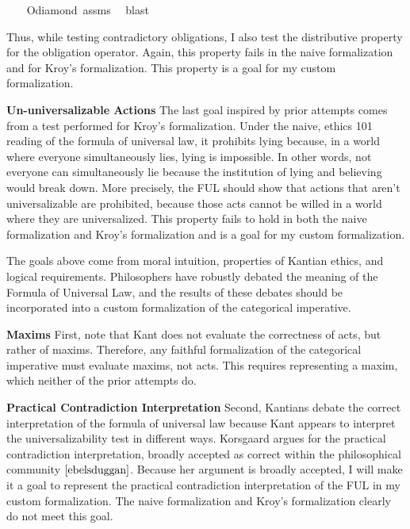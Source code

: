 \begin{isabellebody}
%
\isadelimproof
\ \ %
\endisadelimproof
%
\isatagproof
{}\isamarkupfalse%
\ O{\isacharunderscore}diamond\ assms\ \isamarkupfalse%
\ blast%
\endisatagproof
{\isafoldproof}%
%
\isadelimproof
%
\endisadelimproof
%
\begin{isamarkuptext}%
Thus, while testing contradictory obligations, I also test the distributive property for the 
obligation operator. Again, this property fails in the naive formalization and for Kroy's formalization.
This property is a goal for my custom formalization.

\medskip 

\textbf{Un-universalizable Actions} The last goal inspired by prior attempts comes from a test performed for Kroy's formalization. Under 
the naive, ethics 101 reading of the formula of universal law, it prohibits lying because, in a world 
where everyone simultaneously lies, lying is impossible. In other words, not everyone can simultaneously
lie because the institution of lying and believing would break down. More precisely, the FUL should 
show that actions that aren't universalizable are prohibited, because those acts cannot be willed in 
a world where they are universalized. This property fails to hold in both the naive formalization 
and Kroy's formalization and is a goal for my custom formalization.%
\end{isamarkuptext}\isamarkuptrue%
%
\isadelimdocument
%
\endisadelimdocument
%
\isatagdocument
%
\isamarkuptrue%
%
\endisatagdocument
{\isafolddocument}%
%
\isadelimdocument
%
\endisadelimdocument
%
\begin{isamarkuptext}%
The goals above come from moral intuition, properties of Kantian ethics, and logical requirements. 
Philosophers have robustly debated the meaning of the Formula of Universal Law, and the results of these 
debates should be incorporated into a custom formalization of the categorical imperative. 

\textbf{Maxims} First, note
that Kant does not evaluate the correctness of acts, but rather of maxims. Therefore, any faithful formalization
of the categorical imperative must evaluate maxims, not acts. This requires representing a maxim, which neither
of the prior attempts do.

\medskip%
\end{isamarkuptext}\isamarkuptrue%
%
\begin{isamarkuptext}%
\textbf{Practical Contradiction Interpretation} Second, Kantians debate the correct interpretation of the formula of universal law because Kant appears to 
interpret the universalizability test in different ways. Korsgaard argues for the practical contradiction 
interpretation, broadly accepted as correct within the philosophical community $\cite[177]{ebelsduggan}$.
Because her argument is broadly accepted, I will make it a goal to represent the practical contradiction
interpretation of the FUL in my custom formalization. The naive formalization and Kroy's formalization
clearly do not meet this goal.


\end{isamarkuptext}
\end{isabellebody}
